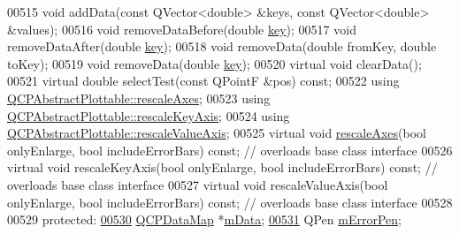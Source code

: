 \begin{DoxyCode}
00515   \textcolor{keywordtype}{void} addData(\textcolor{keyword}{const} QVector<double> &keys, \textcolor{keyword}{const} QVector<double> &values);
00516   \textcolor{keywordtype}{void} removeDataBefore(\textcolor{keywordtype}{double} \hyperlink{a00116_a94bb892c30911cd62cba0707a5395be4}{key});
00517   \textcolor{keywordtype}{void} removeDataAfter(\textcolor{keywordtype}{double} \hyperlink{a00116_a94bb892c30911cd62cba0707a5395be4}{key});
00518   \textcolor{keywordtype}{void} removeData(\textcolor{keywordtype}{double} fromKey, \textcolor{keywordtype}{double} toKey);
00519   \textcolor{keywordtype}{void} removeData(\textcolor{keywordtype}{double} \hyperlink{a00116_a94bb892c30911cd62cba0707a5395be4}{key});
00520   \textcolor{keyword}{virtual} \textcolor{keywordtype}{void} clearData();
00521   \textcolor{keyword}{virtual} \textcolor{keywordtype}{double} selectTest(\textcolor{keyword}{const} QPointF &pos) \textcolor{keyword}{const};
00522   \textcolor{keyword}{using} \hyperlink{a00024_a7e8fc3be43c27ccacd70a7bf9d74a5cd}{QCPAbstractPlottable::rescaleAxes};
00523   \textcolor{keyword}{using} \hyperlink{a00024_a1acecfcca3e7fcda00fcbaa3c886386f}{QCPAbstractPlottable::rescaleKeyAxis};
00524   \textcolor{keyword}{using} \hyperlink{a00024_abfd0805eb1d955c0111a990246658324}{QCPAbstractPlottable::rescaleValueAxis};
00525   \textcolor{keyword}{virtual} \textcolor{keywordtype}{void} \hyperlink{a00116_a098c37f4447cbea48764873689ba1695}{rescaleAxes}(\textcolor{keywordtype}{bool} onlyEnlarge, \textcolor{keywordtype}{bool} includeErrorBars) \textcolor{keyword}{const}; \textcolor{comment}{// overloads base
       class interface}
00526   \textcolor{keyword}{virtual} \textcolor{keywordtype}{void} rescaleKeyAxis(\textcolor{keywordtype}{bool} onlyEnlarge, \textcolor{keywordtype}{bool} includeErrorBars) \textcolor{keyword}{const}; \textcolor{comment}{// overloads base class
       interface}
00527   \textcolor{keyword}{virtual} \textcolor{keywordtype}{void} rescaleValueAxis(\textcolor{keywordtype}{bool} onlyEnlarge, \textcolor{keywordtype}{bool} includeErrorBars) \textcolor{keyword}{const}; \textcolor{comment}{// overloads base class
       interface}
00528   
00529 \textcolor{keyword}{protected}:
\hypertarget{a00116_source_l00530}{}\hyperlink{a00031_a8457c840f69a0ac49f61d30a509c5d08}{00530}   \hyperlink{a00116_a84a9c4a4c2216ccfdcb5f3067cda76e3}{QCPDataMap} *\hyperlink{a00031_a8457c840f69a0ac49f61d30a509c5d08}{mData};
\hypertarget{a00116_source_l00531}{}\hyperlink{a00031_aa35681a24165c2831301091a87b662ce}{00531}   QPen \hyperlink{a00031_aa35681a24165c2831301091a87b662ce}{mErrorPen};

\end{DoxyCode}
